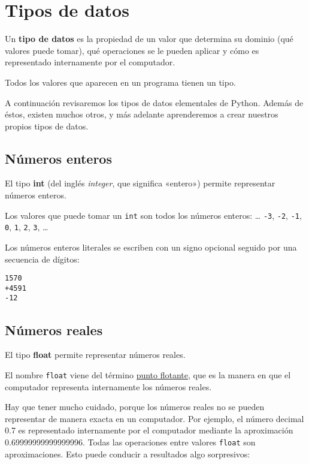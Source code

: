 \section{Tipos de datos}

Un \textbf{tipo de datos} es la propiedad de un valor que determina su
dominio (qué valores puede tomar), qué operaciones se le pueden aplicar
y cómo es representado internamente por el computador.

Todos los valores que aparecen en un programa tienen un tipo.

A continuación revisaremos los tipos de datos elementales de Python.
Además de éstos, existen muchos otros, y más adelante aprenderemos a
crear nuestros propios tipos de datos.

\subsection{Números enteros}

El tipo \textbf{int} (del inglés \emph{integer}, que significa «entero»)
permite representar números enteros.

Los valores que puede tomar un \lstinline!int! son todos los números
enteros: \ldots{} \lstinline!-3!, \lstinline!-2!, \lstinline!-1!,
\lstinline!0!, \lstinline!1!, \lstinline!2!, \lstinline!3!, \ldots{}

Los números enteros literales se escriben con un signo opcional seguido
por una secuencia de dígitos:

\begin{lstlisting}
1570
+4591
-12
\end{lstlisting}

\subsection{Números reales}

El tipo \textbf{float} permite representar números reales.

El nombre \lstinline!float! viene del término
\href{http://es.wikipedia.org/wiki/Punto\_flotante}{punto flotante}, que
es la manera en que el computador representa internamente los números
reales.

Hay que tener mucho cuidado, porque los números reales no se pueden
representar de manera exacta en un computador. Por ejemplo, el número
decimal 0.7 es representado internamente por el computador mediante la
aproximación 0.69999999999999996. Todas las operaciones entre valores
\lstinline!float! son aproximaciones. Esto puede conducir a resultados
algo sorpresivos:

